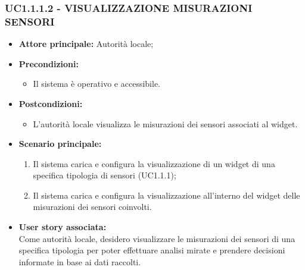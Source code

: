\subsubsection{UC1.1.1.2 - VISUALIZZAZIONE MISURAZIONI SENSORI}
\begin{itemize}
    \item \textbf{Attore principale:} Autorità locale;
    \item \textbf{Precondizioni:}
        \begin{itemize}
            \item Il sistema è operativo e accessibile.
        \end{itemize}
    \item \textbf{Postcondizioni:}
        \begin{itemize}
            \item  L'autorità locale visualizza le misurazioni dei sensori associati al widget.
        \end{itemize}
    \item \textbf{Scenario principale:}
        \begin{enumerate}
            \item Il sistema carica e configura la visualizzazione di un widget di una specifica tipologia di sensori (UC1.1.1);
            \item Il sistema carica e configura la visualizzazione all'interno del widget delle misurazioni dei sensori coinvolti.
        \end{enumerate}
    \item \textbf{User story associata:} \\
        Come autorità locale, desidero visualizzare le misurazioni dei sensori di una specifica tipologia per poter effettuare analisi mirate e prendere decisioni informate in base ai dati raccolti.
\end{itemize}
